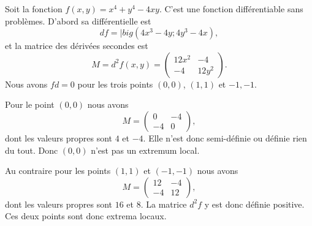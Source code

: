 \begin{example}
    Soit la fonction \( f(x,y)=x^4+y^4-4xy\). C'est une fonction différentiable sans problèmes. D'abord sa différentielle est
    \begin{equation}
        df=|big(4x^3-4y;4y^3-4x),
    \end{equation}
    et la matrice des dérivées secondes est
    \begin{equation}
        M=d^2f(x,y)=\begin{pmatrix}
            12x^2    &   -4    \\ 
            -4    &   12y^2    
        \end{pmatrix}.
    \end{equation}
    Nous avons \( fd=0\) pour les trois points \( (0,0)\), \( (1,1)\) et \( -1,-1\).

    Pour le point \( (0,0)\) nous avons
    \begin{equation}
        M=\begin{pmatrix}
            0    &   -4    \\ 
            -4    &   0    
        \end{pmatrix},
    \end{equation}
    dont les valeurs propres sont \( 4\) et \( -4\). Elle n'est donc semi-définie ou définie rien du tout. Donc \( (0,0)\) n'est pas un extremum local.

    Au contraire pour les points \( (1,1)\) et \( (-1,-1)\) nous avons
    \begin{equation}
        M=\begin{pmatrix}
            12    &   -4    \\ 
            -4    &   12    
        \end{pmatrix},
    \end{equation}
    dont les valeurs propres sont \( 16\) et \( 8\). La matrice \( d^2f\) y est donc définie positive. Ces deux points sont donc extrema locaux.
\end{example}
